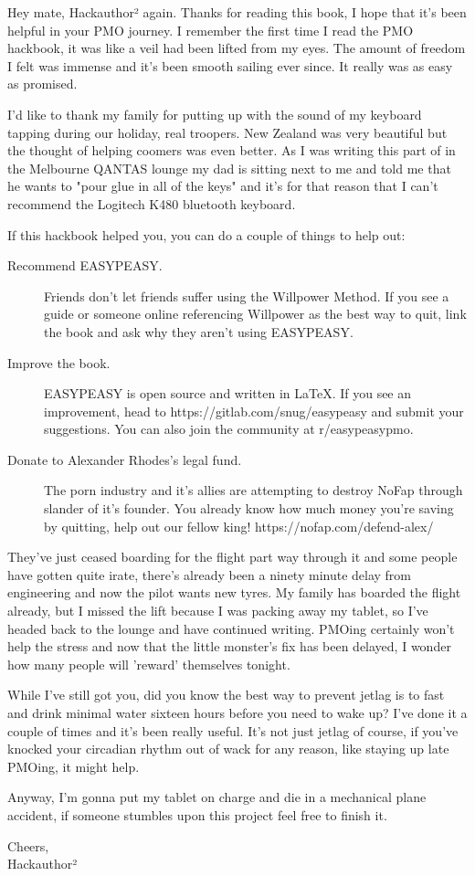\documentclass[easypeasy.tex]{subfiles}
\begin{document}
Hey mate, Hackauthor² again. Thanks for reading this book, I hope that it's been helpful in your PMO journey. I remember the first time I read the PMO hackbook, it was like a veil had been lifted from my eyes. The amount of freedom I felt was immense and it's been smooth sailing ever since. It really was as easy as promised.

I'd like to thank my family for putting up with the sound of my keyboard tapping during our holiday, real troopers. New Zealand was very beautiful but the thought of helping coomers was even better. As I was writing this part of in the Melbourne QANTAS lounge my dad is sitting next to me and told me that he wants to "pour glue in all of the keys" and it's for that reason that I can't recommend the Logitech K480 bluetooth keyboard.

If this hackbook helped you, you can do a couple of things to help out:
  \begin{description}
  \item [Recommend EASYPEASY.] Friends don't let friends suffer using the Willpower Method. If you see a guide or someone online referencing Willpower as the best way to quit, link the book and ask why they aren't using EASYPEASY.

  \item [Improve the book.] EASYPEASY is open source and written in LaTeX. If you see an improvement, head to https://gitlab.com/snug/easypeasy and submit your suggestions. You can also join the community at r/easypeasypmo.

  \item [Donate to Alexander Rhodes's legal fund.] The porn industry and it's allies are attempting to destroy NoFap through slander of it's founder. You already know how much money you're saving by quitting, help out our fellow king! https://nofap.com/defend-alex/
  \end{description}

They've just ceased boarding for the flight part way through it and some people have gotten quite irate, there's already been a ninety minute delay from engineering and now the pilot wants new tyres. My family has boarded the flight already, but I missed the lift because I was packing away my tablet, so I've headed back to the lounge and have continued writing. PMOing certainly won't help the stress and now that the little monster's fix has been delayed, I wonder how many people will 'reward' themselves tonight.

While I've still got you, did you know the best way to prevent jetlag is to fast and drink minimal water sixteen hours before you need to wake up? I've done it a couple of times and it's been really useful. It's not just jetlag of course, if you've knocked your circadian rhythm out of wack for any reason, like staying up late PMOing, it might help.

Anyway, I'm gonna put my tablet on charge and die in a mechanical plane accident, if someone stumbles upon this project feel free to finish it.

Cheers,\\
Hackauthor²
\end{document}
